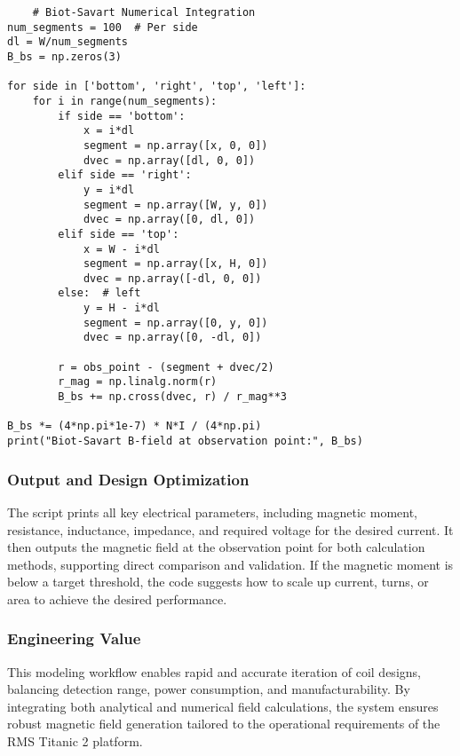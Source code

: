 \begin{verbatim}
    # Biot-Savart Numerical Integration
num_segments = 100  # Per side
dl = W/num_segments
B_bs = np.zeros(3)

for side in ['bottom', 'right', 'top', 'left']:
    for i in range(num_segments):
        if side == 'bottom':
            x = i*dl
            segment = np.array([x, 0, 0])
            dvec = np.array([dl, 0, 0])
        elif side == 'right':
            y = i*dl
            segment = np.array([W, y, 0])
            dvec = np.array([0, dl, 0])
        elif side == 'top':
            x = W - i*dl
            segment = np.array([x, H, 0])
            dvec = np.array([-dl, 0, 0])
        else:  # left
            y = H - i*dl
            segment = np.array([0, y, 0])
            dvec = np.array([0, -dl, 0])
        
        r = obs_point - (segment + dvec/2)
        r_mag = np.linalg.norm(r)
        B_bs += np.cross(dvec, r) / r_mag**3

B_bs *= (4*np.pi*1e-7) * N*I / (4*np.pi)
print("Biot-Savart B-field at observation point:", B_bs)

\end{verbatim}

\subsubsection{Output and Design Optimization}
The script prints all key electrical parameters, including magnetic moment, resistance, inductance, impedance, and required voltage for the desired current. It then outputs the magnetic field at the observation point for both calculation methods, supporting direct comparison and validation. If the magnetic moment is below a target threshold, the code suggests how to scale up current, turns, or area to achieve the desired performance.

\subsubsection{Engineering Value}
This modeling workflow enables rapid and accurate iteration of coil designs, balancing detection range, power consumption, and manufacturability. By integrating both analytical and numerical field calculations, the system ensures robust magnetic field generation tailored to the operational requirements of the RMS Titanic 2 platform.

